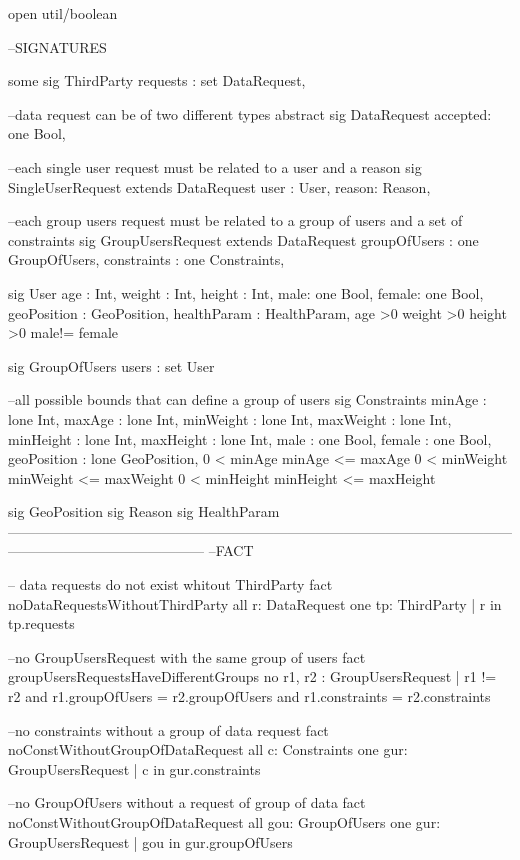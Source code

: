 open util/boolean

--SIGNATURES

some sig ThirdParty{
	requests : set DataRequest, 
}

--data request can be of two different types
abstract sig DataRequest{
	accepted: one Bool,
}

--each single user request must be related to a user and a reason
sig SingleUserRequest extends DataRequest{
	user : User, 
	reason: Reason,
}

--each group users request must be related to a group of users and a set of constraints
sig GroupUsersRequest extends DataRequest{
	groupOfUsers : one GroupOfUsers,
	constraints : one Constraints,
}

sig User{
	age : Int,  
	weight : Int,
	height : Int,
	male: one Bool,
	female: one Bool,
	geoPosition : GeoPosition,
	healthParam : HealthParam,
}{
	age >0 weight >0 height >0  male!= female
}

sig GroupOfUsers{
	users : set User 
}

--all possible bounds that can define a group of users
sig Constraints{
	minAge : lone Int,		
	maxAge : lone Int,			
	minWeight : lone Int,
	maxWeight : lone Int,
	minHeight : lone Int,
	maxHeight : lone Int,
	male : one Bool,
	female : one Bool,
	geoPosition : lone GeoPosition,
}{
	0 < minAge minAge <= maxAge 
	0 < minWeight minWeight <= maxWeight
	0 < minHeight minHeight <= maxHeight
}

sig GeoPosition{}
sig Reason {}
sig HealthParam{}
------------------------------------------------------------------------------------------------------------------------------------------------------
--FACT

-- data requests do not exist whitout ThirdParty
fact noDataRequestsWithoutThirdParty{
	all r: DataRequest {one tp: ThirdParty | r in tp.requests}
}

--no GroupUsersRequest with the same group of users
fact groupUsersRequestsHaveDifferentGroups{
	no r1, r2 : GroupUsersRequest | r1 != r2 and r1.groupOfUsers = r2.groupOfUsers and r1.constraints = r2.constraints
}

--no constraints without a group of data request
fact noConstWithoutGroupOfDataRequest{
	all c: Constraints {one gur: GroupUsersRequest | c in gur.constraints}
}

--no GroupOfUsers without a request of group of data
fact noConstWithoutGroupOfDataRequest{
	all gou: GroupOfUsers {one gur: GroupUsersRequest | gou in gur.groupOfUsers}
}

